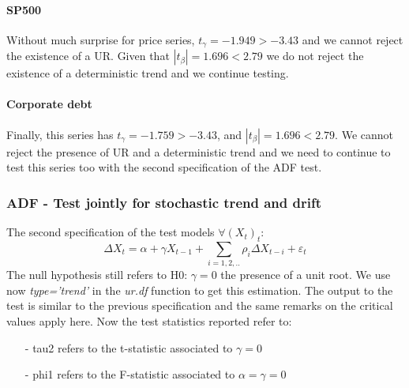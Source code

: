 \documentclass[hidelinks,12pts]{article}
\DeclareMathOperator{\1}{\mathbbm{1}}
\begin{document}
\paragraph{SP500}
Without much surprise for price series, $t_\gamma = -1.949 > -3.43$ and we cannot reject the existence of a UR. 
Given that $|t_\beta| = 1.696 < 2.79$ we do not reject the existence of a deterministic trend and we continue testing.


\paragraph{Corporate debt}
Finally, this series has $t_\gamma = -1.759 > -3.43$, and $|t_\beta| = 1.696 < 2.79$. 
We cannot reject the presence of UR and a deterministic trend and we need to continue to test this series too with the second specification of the ADF test. 







\subsubsection{ADF - Test jointly for stochastic trend and drift}
The second specification of the test models $\forall (X_t)_t$: 
    \begin{equation}
        \Delta X_t = \alpha  + \gamma X_{t-1} +\sum_{i=1,2,..}\rho_i \Delta X_{t-i} + \varepsilon_t
    \end{equation}
The null hypothesis still refers to H0: $\gamma =0$ the presence of a unit root. 
We use now \emph{type='trend'} in the \emph{ur.df} function to get this estimation. 
The output to the test is similar to the previous specification and the same remarks on the critical values apply here. 
Now the test statistics reported refer to: 
    \begin{itemize}
        \item[-] tau2 refers to the t-statistic associated to $\gamma =0$ 
        \item[-] phi1 refers to the F-statistic associated to $\alpha = \gamma =0$ 
    \end{itemize}



\end{document}

